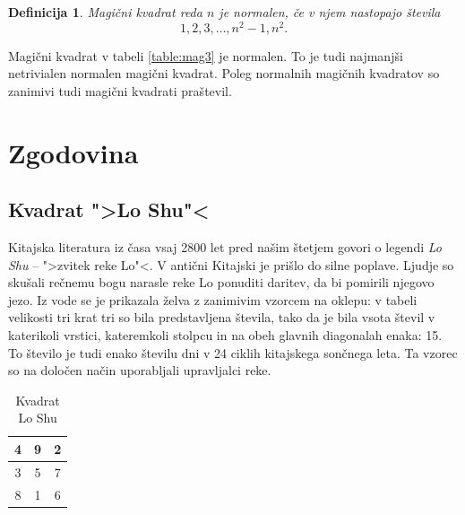 \documentclass[a4paper,12pt]{article}
\newtheorem{definicija}{Definicija}
\newcommand{\pojem}[1]{\emph{\color{purple}#1}}
\newenvironment{magic}[3]
   {\begin{table}[h]
      \caption{#2}
      \label{#3}
      \large
      \centering
      \begin{tabular}{|*{#1}{c|}}
         \hline
   }
      {
      \end{tabular}
      \end{table}
      }
\begin{document}
\begin{definicija}
   Magični kvadrat reda $n$ je \pojem{normalen}, če v njem nastopajo števila
   \begin{equation}
      \label{eq:numbers}
      1, 2, 3, \ldots, n^2-1, n^2.
   \end{equation}
\end{definicija}

Magični kvadrat v tabeli \ref{table:mag3} je normalen.
To je tudi najmanjši netrivialen normalen magični kvadrat.
Poleg normalnih magičnih kvadratov so zanimivi tudi magični kvadrati praštevil.


\section{Zgodovina}

\subsection{Kvadrat ">Lo Shu"<}

Kitajska literatura iz časa vsaj 2800 let pred našim štetjem govori o legendi
\pojem{Lo Shu} -- ">zvitek reke Lo"<. V antični Kitajski je prišlo do
silne poplave. Ljudje so skušali rečnemu bogu narasle reke Lo ponuditi daritev,
da bi pomirili njegovo jezo. Iz vode se je prikazala želva z zanimivim vzorcem
na oklepu: v tabeli velikosti tri krat tri so bila predstavljena števila, tako
da je bila vsota števil v katerikoli vrstici, kateremkoli stolpcu in na obeh
glavnih diagonalah enaka: 15. To število je tudi enako številu dni v 24 ciklih
kitajskega sončnega leta. Ta vzorec so na določen način uporabljali upravljalci
reke.

\begin{magic}{3}{Kvadrat Lo Shu}{table:loshu}
   4 & 9 & 2 \\\hline
   3 & 5 & 7 \\\hline
   8 & 1 & 6 \\\hline
\end{magic}

\end{document}
